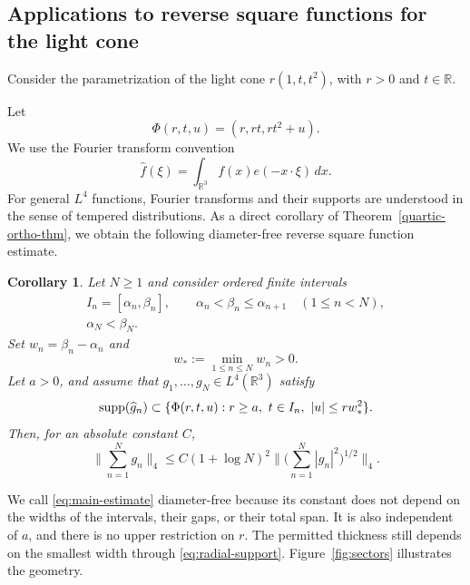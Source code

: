 \documentclass{amsart}
\numberwithin{equation}{section}
\newtheorem{corollary}[theorem]{Corollary}
\newcommand{\wh}{\widehat}
\newcommand{\ZR}{\mathbb{R}}
\newcommand{\supp}{{\rm supp}}
\begin{document}
\bigskip  

\subsection{Applications to reverse square functions for the light cone}

Consider the parametrization of the light cone $r(1,t,t^2)$, with $r>0$ and
$t\in\ZR$. 

Let
\begin{equation}
\nonumber
    \Phi(r,t,u)=(r,rt,rt^2+u).
\end{equation}
We use the Fourier transform convention
\[
    \wh f(\xi)=\int_{\ZR^3}f(x)e(-x\cdot\xi)\,dx.
\]
For general $L^4$ functions, Fourier transforms and their supports are understood in the sense of tempered distributions.
As a direct corollary of Theorem~\ref{quartic-ortho-thm}, we obtain the following diameter-free reverse square function estimate.

\begin{samepage}
\begin{corollary}
\label{main-cor}
Let $N\geq1$ and consider ordered finite intervals
\begin{equation}
\nonumber
\begin{gathered}
    I_n=[\alpha_n,\beta_n],\qquad
    \alpha_n<\beta_n\leq\alpha_{n+1}\quad(1\leq n<N),\\
    \alpha_N<\beta_N.
\end{gathered}
\end{equation}
Set $w_n=\beta_n-\alpha_n$ and
\[
    w_*:=\min_{1\leq n\leq N}w_n>0.
\]
Let $a>0$, and assume that $g_1,\ldots,g_N\in L^4(\ZR^3)$ satisfy
\begin{equation}
\label{eq:radial-support}
    \supp(\wh g_n)\subset
    \{\Phi(r,t,u):r\geq a,\ t\in I_n,\ |u|\leq r w_*^2\}.
\end{equation}
Then, for an absolute constant $C$,
\begin{equation}
\label{eq:main-estimate}
    \Big\|\sum_{n=1}^N g_n\Big\|_4
    \leq C(1+\log N)^2
    \Big\|\Big(\sum_{n=1}^N|g_n|^2\Big)^{1/2}\Big\|_4.
\end{equation}
\end{corollary}
\end{samepage}

We call \eqref{eq:main-estimate} diameter-free because its constant does not depend on the widths of the intervals, their gaps, or their total span. 
It is also independent of $a$, and there is no upper restriction on $r$. 
The permitted thickness still depends on the smallest width through \eqref{eq:radial-support}.
Figure~\ref{fig:sectors} illustrates the geometry.
\end{document}
